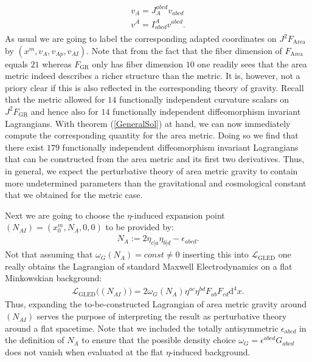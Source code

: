 \begin{align}
    \begin{aligned}
    v_A = J_A^{abcd}v_{abcd} \\
    v^A = I^A_{abcd}v^{abcd}.
    \end{aligned}
\end{align}
As usual we are going to label the corresponding adapted coordinates on $J^2F_{\text{Area}}$ by $(x^m,v_A,v_{Ap},v_{AI})$. 
Note that from the fact that the fiber dimension of $F_{\text{Area}}$ equals $21$ whereas $F_{\text{GR}}$ only has fiber dimension $10$ one readily sees that the area metric indeed describes a richer structure than the metric. It is, however, not a priory clear if this is also reflected in the corresponding theory of gravity. Recall that the metric allowed for $14$ functionally independent curvature scalars on $J^2F_{\text{GR}}$ and hence also for $14$ functionally independent diffeomorphism invariant Lagrangians. With theorem (\ref{GeneralSol}) at hand, we can now immediately compute the corresponding quantity for the area metric. Doing so we find that there exist $179$ functionally independent diffeomorphism invariant Lagrangians that can be constructed from the area metric and its first two derivatives. Thus, in general, we expect the perturbative theory of area metric gravity to contain more undetermined parameters than the gravitational and cosmological constant that we obtained for the metric case.


Next we are going to choose the $\eta$-induced expansion point $(N_{AI}) = (x_0^m, N_A, 0,0)$ to be provided by:
\begin{align}
N_A := 2 \eta_{c[a} \eta_{b]d} - \epsilon_{abcd}.
\end{align}
Not that assuming that $\omega_G(N_A) = const \neq 0$ inserting this into $\mathcal{L}_{\text{GLED}}$ one really obtains the Lagrangian of standard Maxwell Electrodynamics on a flat Minkowskian background:
\begin{align}
    \mathcal{L}_{\text{GLED}}\bigl((N_{AI})\bigr ) = 2 \omega_G(N_A) \eta^{ac}\eta^{bd}F_{ab}F_{cd} \mathrm{d}^4x.
\end{align}
Thus, expanding the to-be-constructed Lagrangian of area metric gravity around $(N_{AI})$ serves the purpose of interpreting the result as perturbative theory around a flat spacetime. Note that we included the totally antisymmetric $\epsilon_{abcd}$ in the definition of $N_A$ to ensure that  the possible density choice $\omega_G = \epsilon^{abcd}G_{abcd}$ does not vanish when evaluated at the flat $\eta$-induced background. 

